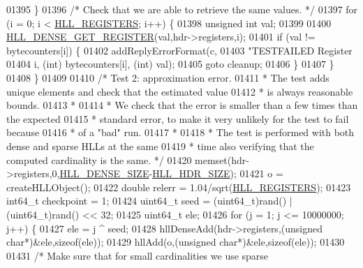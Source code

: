 \begin{DoxyCode}
{{01395         \}
01396         \textcolor{comment}{/* Check that we are able to retrieve the same values. */}
01397         \textcolor{keywordflow}{for} (i = 0; i < \hyperlink{hyperloglog_8c_aa053beb90136828dcb46545c7445fc36}{HLL\_REGISTERS}; i++) \{
01398             \textcolor{keywordtype}{unsigned} \textcolor{keywordtype}{int} val;
01399 
01400             \hyperlink{hyperloglog_8c_abace3387aeb1543c9bcbd0d9a62c7ebc}{HLL\_DENSE\_GET\_REGISTER}(val,hdr->registers,i);
01401             \textcolor{keywordflow}{if} (val != bytecounters[i]) \{
01402                 addReplyErrorFormat(c,
01403                     \textcolor{stringliteral}{"TESTFAILED Register %
01404                     i, (\textcolor{keywordtype}{int}) bytecounters[i], (\textcolor{keywordtype}{int}) val);
01405                 \textcolor{keywordflow}{goto} cleanup;
01406             \}
01407         \}
01408     \}
01409 
01410     \textcolor{comment}{/* Test 2: approximation error.}
01411 \textcolor{comment}{     * The test adds unique elements and check that the estimated value}
01412 \textcolor{comment}{     * is always reasonable bounds.}
01413 \textcolor{comment}{     *}
01414 \textcolor{comment}{     * We check that the error is smaller than a few times than the expected}
01415 \textcolor{comment}{     * standard error, to make it very unlikely for the test to fail because}
01416 \textcolor{comment}{     * of a "bad" run.}
01417 \textcolor{comment}{     *}
01418 \textcolor{comment}{     * The test is performed with both dense and sparse HLLs at the same}
01419 \textcolor{comment}{     * time also verifying that the computed cardinality is the same. */}
01420     memset(hdr->registers,0,\hyperlink{hyperloglog_8c_ad677821a745c7306ef02ccca0ff6f92f}{HLL\_DENSE\_SIZE}-\hyperlink{hyperloglog_8c_af04dc163054c4c79b0e6c93057b4032f}{HLL\_HDR\_SIZE});
01421     o = createHLLObject();
01422     \textcolor{keywordtype}{double} relerr = 1.04/sqrt(\hyperlink{hyperloglog_8c_aa053beb90136828dcb46545c7445fc36}{HLL\_REGISTERS});
01423     int64\_t checkpoint = 1;
01424     uint64\_t seed = (uint64\_t)rand() | (uint64\_t)rand() << 32;
01425     uint64\_t ele;
01426     \textcolor{keywordflow}{for} (j = 1; j <= 10000000; j++) \{
01427         ele = j ^ seed;
01428         hllDenseAdd(hdr->registers,(\textcolor{keywordtype}{unsigned} \textcolor{keywordtype}{char}*)&ele,\textcolor{keyword}{sizeof}(ele));
01429         hllAdd(o,(\textcolor{keywordtype}{unsigned} \textcolor{keywordtype}{char}*)&ele,\textcolor{keyword}{sizeof}(ele));
01430 
01431         \textcolor{comment}{/* Make sure that for small cardinalities we use sparse}
}}}
\end{DoxyCode}
